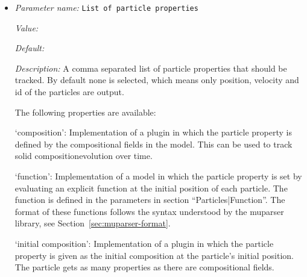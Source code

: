 \begin{itemize}
{\it Default:} cell average


{\it Description:} Select one of the following models:

`bilinear least squares': Interpolates particle properties onto a vector of points using a bilinear least squares method. Currently only 2D models are supported. Note that deal.II must be configured with BLAS/LAPACK.

`cell average': Return the average of all particle properties in the given cell.

`harmonic average': Return the harmonic average of all particle properties in the given cell. If the cell contains no particles, return the harmonic average of the properties in the neighboring cells.

`nearest neighbor': Return the properties of the nearest neighboring particle in the current cell, or nearest particle in nearest neighboring cell if current cell is empty.


{\it Possible values:} Any one of bilinear least squares, cell average, harmonic average, nearest neighbor
\item {\it Parameter name:} {\tt List of particle properties}
\label{parameters:Postprocess/Particles/List of particle properties}
\label{parameters:Postprocess/Particles/List_20of_20particle_20properties}


{\it Value:} 


{\it Default:} 


{\it Description:} A comma separated list of particle properties that should be tracked. By default none is selected, which means only position, velocity and id of the particles are output. 

The following properties are available:

`composition': Implementation of a plugin in which the particle property is defined by the compositional fields in the model. This can be used to track solid compositionevolution over time.

`function': Implementation of a model in which the particle property is set by evaluating an explicit function at the initial position of each particle. The function is defined in the parameters in section ``Particles|Function''. The format of these functions follows the syntax understood by the muparser library, see Section~\ref{sec:muparser-format}.

`initial composition': Implementation of a plugin in which the particle property is given as the initial composition at the particle's initial position. The particle gets as many properties as there are compositional fields.


\end{itemize}
